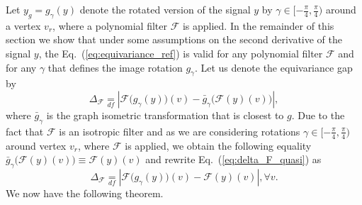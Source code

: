 \documentclass[10pt,journal,compsoc]{IEEEtran}
\newcommand{\df}{\mathop{=}\limits_{df}}
\newcommand{\mF}{\mathcal{F}}
\begin{document}
Let $y_g = g_\gamma(y)$ denote the rotated version of the signal $y$ by $\gamma \in [-\frac{\pi}{4},\frac{\pi}{4})$ around a vertex $v_r$, where a polynomial filter $\mF$ is applied. In the remainder of this section we show that under some assumptions on the second derivative of the signal $y$, the Eq.~(\ref{eq:equivariance_ref}) is valid for any polynomial filter $\mathcal{F}$ and for any $\gamma$ that defines the image rotation $g_\gamma$. Let us denote the equivariance gap by
\begin{equation}
\Delta_\mathcal{F} \df \left| \mathcal{F}\big(g_{\gamma} (y)\big)(v) - \bar{g}_{\gamma}\big(\mathcal{F}(y)(v)\big) \right| ,
\label{eq:delta_F_quasi}
\end{equation}
where $\bar{g}_{\gamma}$ is the graph isometric transformation that is closest to $g$. Due to the fact that $\mF$ is an isotropic filter and as we are considering rotations $\gamma \in [-\frac{\pi}{4},\frac{\pi}{4})$ around vertex $v_r$, where $\mF$ is applied, we obtain the following equality $\bar{g}_{\gamma}\big(\mF(y)(v)\big) \equiv \mF(y)(v)$ and rewrite Eq.~(\ref{eq:delta_F_quasi}) as
\begin{equation}
\Delta_\mathcal{F} \df \left| \mathcal{F}\big(g_{\gamma} (y)\big)(v) - \mathcal{F}(y)(v) \right|, \forall v.
\end{equation}
We now have the following theorem.
\end{document}

